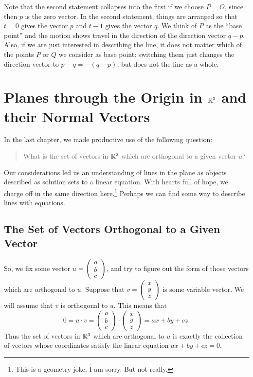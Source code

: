 \documentclass[00-livre-main.tex]{subfiles}
\begin{document}
Note that the second statement collapses into the first if we choose $P=O$, since then $p$ is the zero vector.
In the second statement, things are arranged so that $t=0$ gives the vector $p$ and $t-1$ gives the vector $q$. We think of $P$ as the ``base point'' and the motion shows travel in the direction of the direction vector $q-p$.
Also, if we are just interested in describing the line, it does not matter which of the points $P$ or $Q$ we consider as base point: switching them just changes the direction vector to $p-q = -(q-p)$, but does not the line as a whole.


\section*{Planes through the Origin in $\mathbb{R}^3$ and their Normal Vectors}



In the last chapter, we made productive use of the following question:
\begin{quote}
What is the set of vectors in $\mathbb{R}^2$ which are orthogonal to a given vector $u$?
\end{quote}
Our considerations led us an understanding of lines in the plane as objects described as solution sets to a linear equation. With hearts full of hope, we charge off in the same direction here.\footnote{This is a geometry joke. I am sorry. But not really.} Perhaps we can find some way to describe lines with equations.

\subsection*{The Set of Vectors Orthogonal to a Given Vector}

So, we fix some vector $u = \left(\begin{smallmatrix} a\\ b \\ c\end{smallmatrix}\right)$, and try to figure out the form of those vectors which are orthogonal to $u$. Suppose that $v= \left( \begin{smallmatrix} x \\ y \\ z \end{smallmatrix}\right)$ is some variable vector. We will assume that $v$ is orthogonal to $u$. This means that 
\[
0 = u\cdot v = \begin{pmatrix} a \\ b \\ c \end{pmatrix} \cdot \begin{pmatrix} x\\y\\z\end{pmatrix} = ax + by +cz.
\]
Thus the set of vectors in $\mathbb{R}^3$ which are orthogonal to $u$ is exactly the collection of vectors whose coordinates satisfy the linear equation $ax+by+cz=0$.
\end{document}
